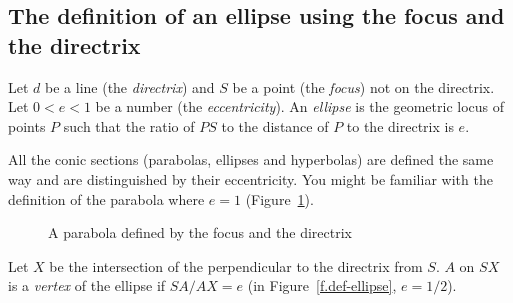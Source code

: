 \begin{center}
\end{center}



\subsection{The definition of an ellipse using the focus and the directrix}

\begin{definition}
Let $d$ be a line (the \emph{directrix}) and $S$ be a point (the \emph{focus}) not on the directrix. Let $0<e<1$ be a number (the \emph{eccentricity}). An \emph{ellipse} is the geometric locus of points $P$ such that the ratio of  $PS$ to the distance of $P$ to the directrix is $e$.
\end{definition}

All the conic sections (parabolas, ellipses and hyperbolas) are defined the same way and are distinguished by their eccentricity. You might be familiar with the definition of the parabola where $e=1$ (Figure~\ref{f.parabola}).

\begin{figure}[t]
\begin{center}
\end{center}
\caption{A parabola defined by the focus and the directrix}\label{f.parabola}
\end{figure}

\begin{definition}
Let $X$ be the intersection of the perpendicular to the directrix from $S$. $A$ on $SX$ is a \emph{vertex} of the ellipse if $SA/AX=e$ (in Figure~\ref{f.def-ellipse}, $e=1/2$).
\end{definition}

